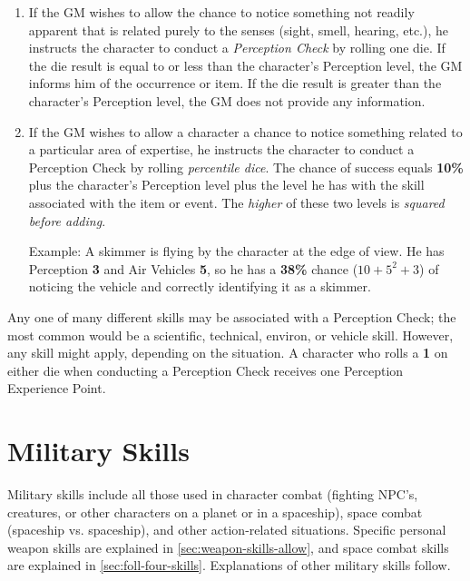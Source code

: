 \begin{enumerate}
\item If the GM wishes to allow the chance to notice something not
  readily apparent that is related purely to the senses (sight, smell,
  hearing, etc.), he instructs the character to conduct a
  \emph{Perception Check} by rolling one die.  If the die result is
  equal to or less than the character's Perception level, the GM
  informs him of the occurrence or item.  If the die result is greater
  than the character's Perception level, the GM does not provide any
  information.
\item If the GM wishes to allow a character a chance to notice
  something related to a particular area of expertise, he instructs
  the character to conduct a Perception Check by rolling
  \emph{percentile dice}.  The chance of success equals \textbf{10\%} plus the
  character's Perception level plus the level he has with the skill
  associated with the item or event.  The \emph{higher} of these two
  levels is \emph{squared before adding}.
  
  Example: A skimmer is flying by the character at the edge of view.
  He has Perception \textbf{3} and Air Vehicles \textbf{5}, so he has
  a \textbf{38\%} chance ($10+5^2+3$) of noticing the vehicle and correctly
  identifying it as a skimmer.
\end{enumerate}

Any one of many different skills may be associated with a Perception
Check; the most common would be a scientific, technical, environ, or
vehicle skill.  However, any skill might apply, depending on the
situation.
A character who rolls a \textbf{1} on either die when conducting a
Perception Check receives one Perception Experience
Point.

\section{Military Skills}
\label{sec:military-skills}

Military skills include all those used in character combat (fighting
NPC's, creatures, or other characters on a planet or in a spaceship),
space combat (spaceship vs. spaceship), and other action-related
situations.  Specific personal weapon skills are explained in
\ref{sec:weapon-skills-allow}, and space combat skills are explained
in \ref{sec:foll-four-skills}.  Explanations of other military skills
follow.

